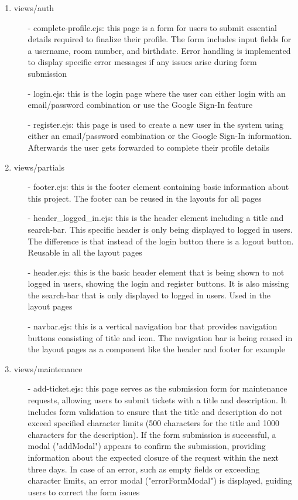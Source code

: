 \documentclass[conference]{IEEEtran}
\begin{document}
\begin{enumerate}
\begin{enumerate}
            \item views/auth
                \begin{itemize}
                    \item[-] complete-profile.ejs: this page is a form for users to submit essential details required to finalize their profile. The form includes input fields for a username, room number, and birthdate. Error handling is implemented to display specific error messages if any issues arise during form submission
                    \item[-] login.ejs: this is the login page where the user can either login with an email/password combination or use the Google Sign-In feature
                    \item[-] register.ejs: this page is used to create a new user in the system using either an email/password combination or the Google Sign-In information. Afterwards the user gets forwarded to complete their profile details
                \end{itemize}
            \item views/partials
                \begin{itemize}
                    \item[-] footer.ejs: this is the footer element containing basic information about this project. The footer can be reused in the layouts for all pages
                    \item[-] header\_logged\_in.ejs: this is the header element including a title and search-bar. This specific header is only being displayed to logged in users. The difference is that instead of the login button there is a logout button. Reusable in all the layout pages
                    \item[-] header.ejs: this is the basic header element that is being shown to not logged in users, showing the login and register buttons. It is also missing the search-bar that is only displayed to logged in users. Used in the layout pages
                    \item[-] navbar.ejs: this is a vertical navigation bar that provides navigation buttons consisting of title and icon. The navigation bar is being reused in the layout pages as a component like the header and footer for example
                \end{itemize}
            \item views/maintenance
                \begin{itemize}
                    \item[-] add-ticket.ejs: this page serves as the submission form for maintenance requests, allowing users to submit tickets with a title and description. It includes form validation to ensure that the title and description do not exceed specified character limits (500 characters for the title and 1000 characters for the description). If the form submission is successful, a modal ("addModal") appears to confirm the submission, providing information about the expected closure of the request within the next three days. In case of an error, such as empty fields or exceeding character limits, an error modal ("errorFormModal") is displayed, guiding users to correct the form issues

\end{itemize}
\end{enumerate}
\end{enumerate}
\end{document}
